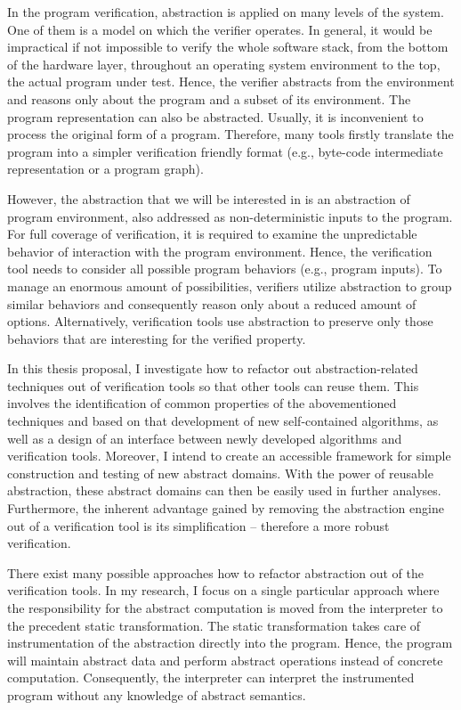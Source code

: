 In the program verification, abstraction is applied on many levels of the
system.  One of them is a model on which the verifier operates. In general, it
would be impractical if not impossible to verify the whole software stack, from
the bottom of the hardware layer, throughout an operating system environment to
the top, the actual program under test. Hence, the verifier abstracts from the
environment and reasons only about the program and a subset of its environment.
The program representation can also be abstracted.  Usually, it is inconvenient
to process the original form of a program. Therefore, many tools firstly
translate the program into a simpler verification friendly format  (e.g.,
byte-code intermediate representation or a program graph).

However, the abstraction that we will be interested in is an abstraction of
program environment, also addressed as non-deter\-mi\-ni\-stic inputs to the program.
For full coverage of verification, it is required to examine the unpredictable
behavior of interaction with the program environment. Hence, the verification
tool needs to consider all possible program behaviors (e.g., program inputs).
To manage an enormous amount of possibilities, verifiers utilize abstraction to
group similar behaviors and consequently reason only about a reduced amount of
options. Alternatively, verification tools use abstraction to preserve only
those behaviors that are interesting for the verified property.

In this thesis proposal, I investigate how to refactor out abstraction-related
techniques out of verification tools so that other tools can reuse them. This
involves the identification of common properties of the abovementioned
techniques and based on that development of new self-con\-tained algorithms, as
well as a design of an interface between newly developed algorithms and
verification tools. Moreover, I intend to create an accessible framework for
simple construction and testing of new abstract domains. With the power of
reusable abstraction, these abstract domains can then be easily used in further
analyses. Furthermore, the inherent advantage gained by removing the
abstraction engine out of a verification tool is its simplification --
therefore a more robust verification.

There exist many possible approaches how to refactor abstraction out of the
verification tools. In my research, I focus on a single particular approach
where the responsibility for the abstract computation is moved from the
interpreter to the precedent static transformation. The static transformation
takes care of instrumentation of the abstraction directly into the program.
Hence, the program will maintain abstract data and perform abstract operations
instead of concrete computation. Conse\-quen\-tly, the interpreter can interpret
the instrumented program without any knowledge of abstract semantics.

